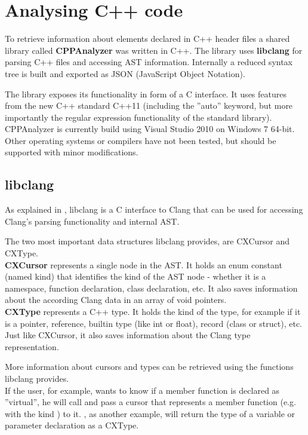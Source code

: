 \chapter{Analysing C++ code}
\label{chap:AnalysingCPP}

To retrieve information about elements declared in C++ header files a shared library called \textbf{CPPAnalyzer} was written in C++. The library uses \textbf{libclang} for parsing C++ files and accessing AST information. Internally a reduced syntax tree is built and exported as JSON (JavaScript Object Notation).

The library exposes its functionality in form of a C interface. It uses features from the new C++ standard C++11 (including the ''auto'' keyword, but more importantly the regular expression functionality of the standard library). CPPAnalyzer is currently build using Visual Studio 2010 on Windows 7 64-bit. Other operating systems or compilers have not been tested, but should be supported with minor modifications.

\section{libclang}

As explained in , libclang is a C interface to Clang that can be used for accessing Clang's parsing functionality and internal AST.


The two most important data structures libclang provides, are CXCursor and CXType.
\\\textbf{CXCursor} represents a single node in the AST. It holds an enum constant (named kind) that identifies the kind of the AST node - whether it is a namespace, function declaration, class declaration, etc. It also saves information about the according Clang data in an array of void pointers.
\\\textbf{CXType} represents a C++ type. It holds the kind of the type, for example if it is a pointer, reference, builtin type (like int or float), record (class or struct), etc. Just like CXCursor, it also saves information about the Clang type representation.

More information about cursors and types can be retrieved using the functions libclang provides.
\\If the user, for example, wants to know if a member function is declared as ''virtual'', he will call  and pass a cursor that represents a member function (e.g. with the kind ) to it. , as another example, will return the type of a variable or parameter declaration as a CXType.

